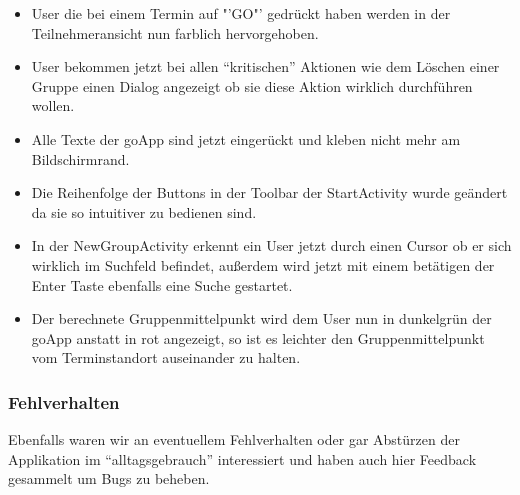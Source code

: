 \documentclass{scrartcl}
\begin{document}
			\begin{itemize}
				\item User die bei einem Termin auf "'GO"' gedrückt haben werden in der Teilnehmeransicht nun farblich hervorgehoben.  
				\item User bekommen jetzt bei allen "`kritischen"' Aktionen wie dem Löschen einer Gruppe einen Dialog angezeigt ob sie diese Aktion wirklich durchführen wollen.
				\item Alle Texte der goApp sind jetzt eingerückt und kleben nicht mehr am Bildschirmrand.
				\item Die Reihenfolge der Buttons in der Toolbar der StartActivity wurde geändert da sie so intuitiver zu bedienen sind.
				\item In der NewGroupActivity erkennt ein User jetzt durch einen Cursor ob er sich wirklich im Suchfeld befindet, außerdem wird jetzt mit einem betätigen der Enter Taste ebenfalls eine Suche gestartet.
				\item Der berechnete Gruppenmittelpunkt wird dem User nun in dunkelgrün der goApp anstatt in rot angezeigt, so ist es leichter den Gruppenmittelpunkt vom Terminstandort auseinander zu halten.
			\end{itemize}
		
		\subsubsection{Fehlverhalten}
		Ebenfalls waren wir an eventuellem Fehlverhalten oder gar Abstürzen der Applikation im "`alltagsgebrauch"' interessiert und haben auch hier Feedback gesammelt um Bugs zu beheben.
\end{document}
